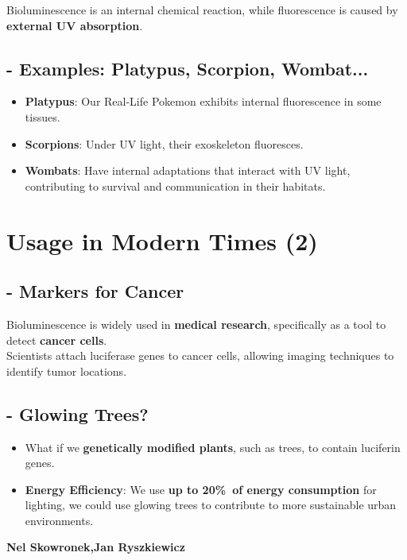 \documentclass{article}
\begin{document}
Bioluminescence is an internal chemical reaction, while fluorescence is caused by \textbf{external UV absorption}.

\subsection*{- Examples: Platypus, Scorpion, Wombat... }
\begin{itemize}
 \item\textbf{Platypus}: Our Real-Life Pokemon exhibits internal fluorescence in some tissues.
 \item\textbf{Scorpions}: Under UV light, their exoskeleton fluoresces.
 \item\textbf{Wombats}: Have internal adaptations that interact with UV light, contributing to survival and communication in their habitats.
\end{itemize}


\section*{Usage in Modern Times (2)}

\subsection*{- Markers for Cancer }
Bioluminescence is widely used in \textbf{medical research}, specifically as a tool to detect \textbf{cancer cells}.\\ 
Scientists attach luciferase genes to cancer cells, allowing imaging techniques to identify tumor locations.

\subsection*{- Glowing Trees? }
\begin{itemize}
 \item What if we \textbf{genetically modified plants}, such as trees, to contain luciferin genes.
 \item \textbf{Energy Efficiency}: We use \textbf{up to 20\%\ of energy consumption} for lighting, 
   we could use glowing trees to contribute to more sustainable urban environments.
\end{itemize}

\hfill
\textbf{Nel Skowronek,Jan Ryszkiewicz}
\end{document}
